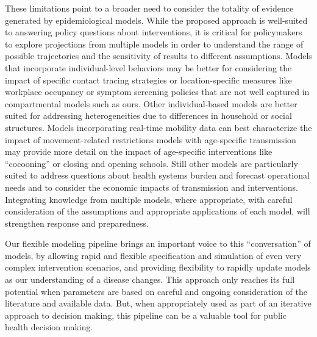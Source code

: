 These limitations point to a broader need to consider the totality of evidence generated by epidemiological models. While the proposed approach is well-suited to answering policy questions about interventions, it is critical for policymakers to explore projections from multiple models in order to understand the range of possible trajectories and the sensitivity of results to different assumptions. Models that incorporate individual-level behaviors may be better for considering the impact of specific contact tracing strategies or location-specific measures like workplace occupancy or symptom screening policies that are not well captured in compartmental models such as ours\cite[-5\baselineskip]{Kucharski:EffectivenessIsolationTesting:2020,Firth:UsingRealworldNetwork:2020,Hinch:OpenABMCovid19AgentbasedModel:2020}. Other individual-based models are better suited for addressing heterogeneities due to differences in household or social structures\cite{Wilder:ModelingBetweenpopulationVariation:2020,Kerr:CovasimAgentbasedModel:2021}. Models incorporating real-time mobility data can best characterize the impact of movement-related restrictions\cite{Lai:EffectNonpharmaceuticalInterventions:2020} models with age-specific transmission may provide more detail on the impact of age-specific interventions like “cocooning”\cite{Duque:COVID19HowRelax:2020} or closing and opening schools\cite{Ferguson:ReportImpactNonpharmaceutical:2020}. Still other models are particularly suited to address questions about health systems burden and forecast operational needs\cite{Branas:FlatteningCurveIt:2020,LosAlamosNationalLaboratory:COVID19CasesDeaths,Weissman:LocallyInformedSimulation:2020} and to consider the economic impacts of transmission and interventions\cite{Acemoglu:OptimalTargetedLockdowns:2020,Silva:COVIDABSAgentbasedModel:2020}. Integrating knowledge from multiple models, where appropriate, with careful consideration of the assumptions and appropriate applications of each model, will strengthen response and preparedness\cite{Shea:HarnessingMultipleModels:2020}.


Our flexible modeling pipeline brings an important voice to this “conversation” of models, by allowing rapid and flexible specification and simulation of even very complex intervention scenarios, and providing flexibility to rapidly update models as our understanding of a disease changes. This approach only reaches its full potential when parameters are based on careful and ongoing consideration of the literature and available data. But, when appropriately used as part of an iterative approach to decision making, this pipeline can be a valuable tool for public health decision making.

